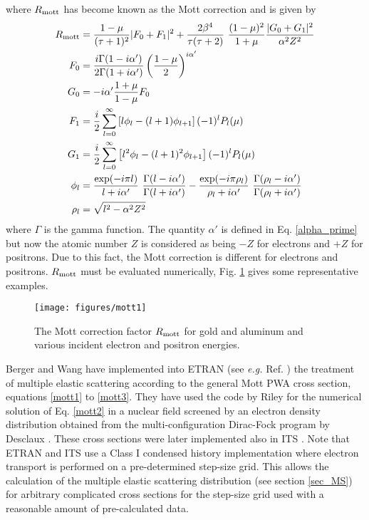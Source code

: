 where $R_{\rm mott}$ has become known as the Mott correction
and is given by
\begin{equation}
\begin{split}
R_{\rm mott} & = {1 - \mu \over (\tau + 1)^2} |F_0 + F_1|^2 +
{2 \beta^4 \over \tau (\tau + 2)}~{(1 - \mu)^2 \over 1 + \mu}
{|G_0 + G_1|^2 \over \alpha^2 Z^2} \\
F_0 & = {i \Gamma(1 - i \alpha') \over 2 \Gamma(1 + i \alpha')}
\left( {1 - \mu \over 2} \right)^{i \alpha'} \\
G_0 & = -i \alpha' {1 + \mu \over 1 - \mu} F_0 \\
F_1 & = \frac{i}{2} \sum_{l=0}^\infty \left[ l \phi_l - (l+1) \phi_{l+1}
\right] (-1)^l P_l(\mu) \\
G_1 & = \frac{i}{2} \sum_{l=0}^\infty \left[ l^2 \phi_l - (l+1)^2 \phi_{l+1}
\right] (-1)^l P_l(\mu) \\
\phi_l &= {\exp(-i \pi l) \over l + i \alpha'} ~ {\Gamma(l - i \alpha')
\over \Gamma(l + i \alpha') } - {\exp(-i \pi \rho_l) \over
\rho_l + i \alpha'}~ {\Gamma(\rho_l - i \alpha') \over
\Gamma(\rho_l + i \alpha') } \\
\rho_l & = \sqrt{ l^2 - \alpha^2 Z^2 }
\end{split}
\end{equation}
where $\Gamma$ is the gamma function. The quantity $\alpha'$ is defined
in Eq. \eqref{alpha_prime} but now the atomic number $Z$ is considered
as being $-Z$ for electrons and $+Z$ for positrons. Due to
this fact, the Mott correction is different for electrons and positrons.
$R_{\rm mott}$ must be evaluated numerically, Fig. \ref{fig_mott} gives some
representative examples.
\begin{figure}[htp]
\texttt{[image: figures/mott1]}
\caption[The Mott correction]{\label{fig_mott} The Mott correction factor
$R_{\rm mott}$ for gold and aluminum and various incident
electron and positron energies.}
\end{figure}

Berger and Wang \cite{BW89} have implemented into ETRAN (see {\em e.g.}
Ref. \cite{Se89})
the treatment of multiple
elastic scattering according to the general Mott PWA cross section,
equations \eqref{mott1} to \eqref{mott3}. They have used the code
by Riley \cite{Ri74} for the numerical solution of Eq. \eqref{mott2}
in a nuclear field screened by an electron density distribution
obtained from the multi-configuration Dirac-Fock program by
Desclaux \cite{De75}. These cross sections were later implemented
also in ITS \cite{ITSV3}. Note that ETRAN and ITS use a Class I
condensed history implementation where electron transport is
performed on  a pre-determined step-size grid. This allows
the calculation of the multiple elastic scattering distribution
(see section \ref{sec_MS}) for arbitrary complicated cross
sections for the step-size grid used with a reasonable amount
of pre-calculated data.

